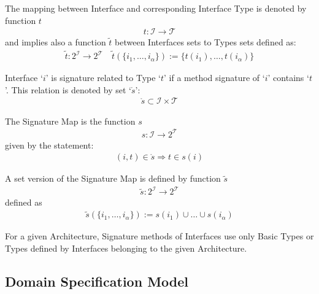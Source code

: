 The mapping between Interface and corresponding Interface Type is denoted by function $t$
\begin{eqnarray}
t:\mathcal{I}\rightarrow\mathcal{T}
\end{eqnarray}
and implies also a function $\tilde{t}$ between Interfaces sets to Types sets defined as:
\begin{eqnarray}
\tilde{t}:2^\mathcal{I}\rightarrow 2^\mathcal{T} \quad
 \tilde{t}(\{i_1,\dots,i_\alpha\}) := \{t(i_1),\dots,t(i_\alpha) \}
\end{eqnarray}

\begin{defi}
  Interface `$i$' is signature related to Type `$t$' if a method signature of `$i$' contains `$t$'. This relation is denoted by set `$\mathring{s}$':
\begin{eqnarray}
\mathring{s}\subset \mathcal{I}\times \mathcal{T}
\end{eqnarray}
\end{defi}

\begin{defi}
The Signature Map is the function $s$
\begin{eqnarray}
&s:\mathcal{I}\rightarrow 2^\mathcal{T}&
\end{eqnarray}
given by the statement:
\begin{eqnarray}
&(i,t) \in \mathring{s} \Rightarrow t\in s(i) &\nonumber
\end{eqnarray}

A set version of the Signature Map is defined by function $\tilde{s}$
\begin{eqnarray}
&\tilde{s}:2^\mathcal{I}\rightarrow 2^\mathcal{T}& 
\end{eqnarray}
defined as 
\begin{eqnarray}
&\tilde{s}(\{i_1,\dots,i_\alpha\}) := s(i_1) \cup \dots \cup s(i_\alpha) &
\end{eqnarray}

\end{defi}

\begin{zalozenie}
 \item For a given Architecture, Signature methods of Interfaces use only Basic Types or Types defined by Interfaces belonging to the given Architecture.
\end{zalozenie}

\subsection{Domain Specification Model}

